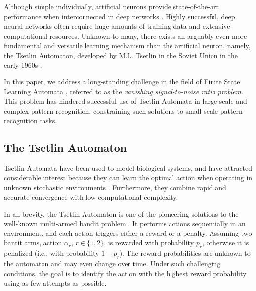 \documentclass[11pt,a4paper]{article}
\begin{document}
Although simple individually, artificial neurons provide state-of-the-art performance when interconnected in deep networks \cite{LeCun2015}.
Highly successful, deep neural networks often require huge amounts of training data and extensive computational resources. Unknown to many, there exists an arguably even more fundamental and versatile learning mechanism than the artificial neuron, namely, the Tsetlin Automaton, developed by M.L. Tsetlin in the Soviet Union in the early 1960s \cite{Tsetlin1961}.

In this paper, we address a long-standing challenge in the field of Finite State Learning Automata \cite{Narendra1989}, referred to as the \emph{vanishing signal-to-noise ratio problem}. This problem has hindered successful use of Tsetlin Automata in large-scale and complex pattern recognition, constraining such solutions to small-scale pattern recognition tasks.

\subsection{The Tsetlin Automaton}
Tsetlin Automata have been used to model biological systems, and have attracted considerable interest because they can learn the optimal action when operating in unknown stochastic
environments \cite{Tsetlin1961,Narendra1989}. Furthermore, they combine rapid and accurate convergence with low computational complexity.

In all brevity, the Tsetlin Automaton is one of the pioneering solutions to the well-known multi-armed bandit problem \cite{Robbins1952,Gittins1979}. It performs actions sequentially in an environment, and each action triggers either a reward or a penalty. Assuming two bantit arms, action $\alpha_r$, $r\in \{1, 2\}$, is rewarded with probability $p_r$, otherwise it is penalized (i.e., with probability $1 - p_r$). The reward  probabilities are unknown to the automaton and may even change over time. Under such challenging conditions, the goal is to identify the action with the highest reward probability using as few attempts as possible.
\end{document}
